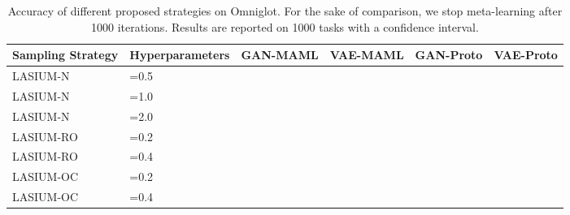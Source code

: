 \documentclass{article}
\begin{document}
\begin{table}[]
    \caption{Accuracy of different proposed strategies on Omniglot. For the sake of comparison, we stop meta-learning after 1000 iterations. Results are reported on 1000 tasks with a  confidence interval.}
    \label{tab:ablation1}
    \centering
    {\footnotesize
        \begin{tabular}{p{2.3cm}p{1.9cm}p{1.8cm}p{1.75cm}p{1.75cm}p{1.75cm}}
            \toprule
            Sampling Strategy & Hyperparameters & GAN-MAML & VAE-MAML & GAN-Proto & VAE-Proto \\
            \midrule
LASIUM-N & =0.5 &  &  &  &  \\
            LASIUM-N & =1.0 &  &  &  &  \\
            LASIUM-N & =2.0 &  &  &  &  \\
\midrule
            LASIUM-RO & =0.2 &  &  &  & \\
            LASIUM-RO & =0.4 &  &  &  & \\
            \midrule
            LASIUM-OC & =0.2 &  &  &  &  \\
            LASIUM-OC & =0.4 &  &  &  & \\
            
            
            \bottomrule
        \end{tabular}
    }
\end{table}













    
\end{document}
